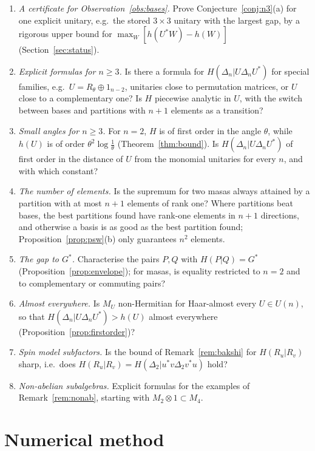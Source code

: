 \documentclass[11pt]{article}
\theoremstyle{plain}
\theoremstyle{definition}
\theoremstyle{remark}
\begin{document}
\begin{enumerate}
\item[(1)] \emph{A certificate for Observation~\ref{obs:bases}.} Prove Conjecture~\ref{conj:n3}(a) for one explicit unitary,
e.g.\ the stored $3\times3$ unitary with the largest gap, by a rigorous upper bound for $\max_W[h(U^*W)-h(W)]$
(Section~\ref{sec:status}).
\item[(2)] \emph{Explicit formulas for $n\ge3$.} Is there a formula for $H(\Delta_n|U\Delta_nU^*)$ for special families, e.g.\
$U=R_\theta\oplus1_{n-2}$, unitaries close to permutation matrices, or $U$ close to a complementary one? Is $H$ piecewise
analytic in $U$, with the switch between bases and partitions with $n+1$ elements as a transition?
\item[(3)] \emph{Small angles for $n\ge3$.} For $n=2$, $H$ is of first order in the angle $\theta$, while $h(U)$ is of order
$\theta^2\log\frac1\theta$ (Theorem~\ref{thm:bound}). Is $H(\Delta_n|U\Delta_nU^*)$ of first order in the distance of $U$ from the
monomial unitaries for every $n$, and with which constant?
\item[(4)] \emph{The number of elements.} Is the supremum for two masas always attained by a partition with at most $n+1$
elements of rank one? Where partitions beat bases, the best partitions found have rank-one elements in $n+1$ directions,
and otherwise a basis is as good as the best partition found; Proposition~\ref{prop:psw}(b) only guarantees $n^2$ elements.
\item[(5)] \emph{The gap to $G^*$.} Characterise the pairs $P,Q$ with $H(P|Q)=G^*$ (Proposition~\ref{prop:envelope}); for masas,
is equality restricted to $n=2$ and to complementary or commuting pairs?
\item[(6)] \emph{Almost everywhere.} Is $M_U$ non-Hermitian for Haar-almost every $U\in U(n)$, so that
$H(\Delta_n|U\Delta_nU^*)>h(U)$ almost everywhere (Proposition~\ref{prop:firstorder})?
\item[(7)] \emph{Spin model subfactors.} Is the bound of Remark~\ref{rem:bakshi} for $H(R_u|R_v)$ sharp, i.e.\ does
$H(R_u|R_v)=H(\Delta_2|u^*v\Delta_2v^*u)$ hold?
\item[(8)] \emph{Non-abelian subalgebras.} Explicit formulas for the examples of Remark~\ref{rem:nonab}, starting with
$M_2\otimes1\subset M_4$.
\end{enumerate}

\appendix

\section{Numerical method}\label{app:numerics}
\end{document}
